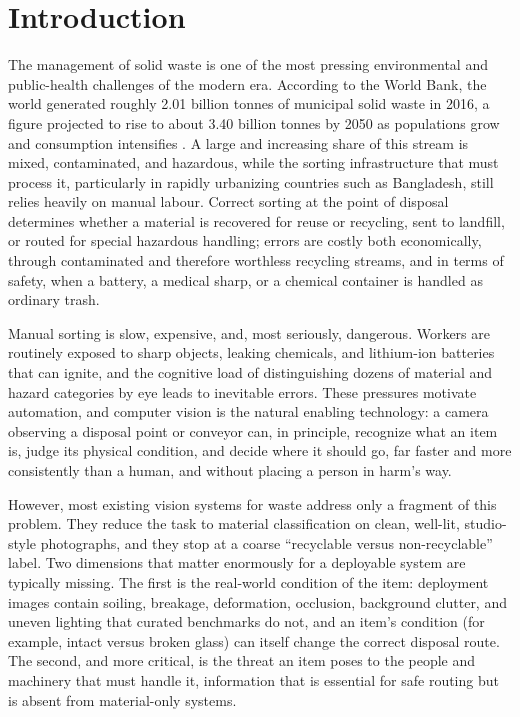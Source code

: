 \section{Introduction}
\label{intro}
The management of solid waste is one of the most pressing environmental and public-health challenges of the modern era. According to the World Bank, the world generated roughly 2.01 billion tonnes of municipal solid waste in 2016, a figure projected to rise to about 3.40 billion tonnes by 2050 as populations grow and consumption intensifies \cite{whatawaste}. A large and increasing share of this stream is mixed, contaminated, and hazardous, while the sorting infrastructure that must process it, particularly in rapidly urbanizing countries such as Bangladesh, still relies heavily on manual labour. Correct sorting at the point of disposal determines whether a material is recovered for reuse or recycling, sent to landfill, or routed for special hazardous handling; errors are costly both economically, through contaminated and therefore worthless recycling streams, and in terms of safety, when a battery, a medical sharp, or a chemical container is handled as ordinary trash.

Manual sorting is slow, expensive, and, most seriously, dangerous. Workers are routinely exposed to sharp objects, leaking chemicals, and lithium-ion batteries that can ignite, and the cognitive load of distinguishing dozens of material and hazard categories by eye leads to inevitable errors. These pressures motivate automation, and computer vision is the natural enabling technology: a camera observing a disposal point or conveyor can, in principle, recognize what an item is, judge its physical condition, and decide where it should go, far faster and more consistently than a human, and without placing a person in harm's way.

However, most existing vision systems for waste address only a fragment of this problem. They reduce the task to material classification on clean, well-lit, studio-style photographs, and they stop at a coarse ``recyclable versus non-recyclable'' label. Two dimensions that matter enormously for a deployable system are typically missing. The first is the real-world condition of the item: deployment images contain soiling, breakage, deformation, occlusion, background clutter, and uneven lighting that curated benchmarks do not, and an item's condition (for example, intact versus broken glass) can itself change the correct disposal route. The second, and more critical, is the threat an item poses to the people and machinery that must handle it, information that is essential for safe routing but is absent from material-only systems.


